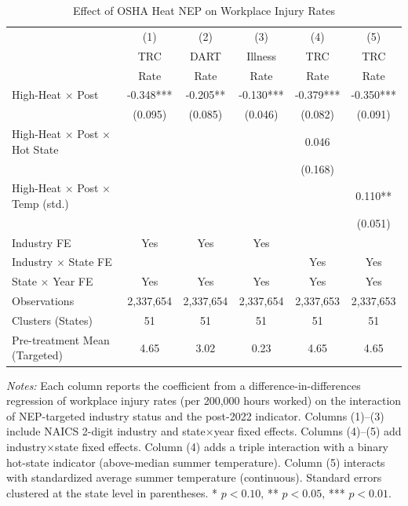 \begin{table}[H]
\centering
\caption{Effect of OSHA Heat NEP on Workplace Injury Rates}
\label{tab:main}
\small
\begin{threeparttable}
\begin{tabular}{lccccc}
\toprule
 & (1) & (2) & (3) & (4) & (5) \\
 & TRC & DART & Illness & TRC & TRC \\
 & Rate & Rate & Rate & Rate & Rate \\
\midrule
High-Heat $\times$ Post & -0.348*** & -0.205** & -0.130*** & -0.379*** & -0.350*** \\
 & (0.095) & (0.085) & (0.046) & (0.082) & (0.091) \\
\addlinespace
High-Heat $\times$ Post $\times$ Hot State & & & & 0.046 & \\
 & & & & (0.168) & \\
\addlinespace
High-Heat $\times$ Post $\times$ Temp (std.) & & & & & 0.110** \\
 & & & & & (0.051) \\
\addlinespace
\midrule
Industry FE & Yes & Yes & Yes & & \\
Industry $\times$ State FE & & & & Yes & Yes \\
State $\times$ Year FE & Yes & Yes & Yes & Yes & Yes \\
Observations & 2,337,654 & 2,337,654 & 2,337,654 & 2,337,653 & 2,337,653 \\
Clusters (States) & 51 & 51 & 51 & 51 & 51 \\
Pre-treatment Mean (Targeted) & 4.65 & 3.02 & 0.23 & 4.65 & 4.65 \\
\bottomrule
\end{tabular}
\begin{tablenotes}[flushleft]
\footnotesize
\item \textit{Notes:} Each column reports the coefficient from a difference-in-differences regression of workplace injury rates (per 200,000 hours worked) on the interaction of NEP-targeted industry status and the post-2022 indicator. Columns (1)--(3) include NAICS 2-digit industry and state$\times$year fixed effects. Columns (4)--(5) add industry$\times$state fixed effects. Column (4) adds a triple interaction with a binary hot-state indicator (above-median summer temperature). Column (5) interacts with standardized average summer temperature (continuous). Standard errors clustered at the state level in parentheses. * $p<0.10$, ** $p<0.05$, *** $p<0.01$.
\end{tablenotes}
\end{threeparttable}
\end{table}

